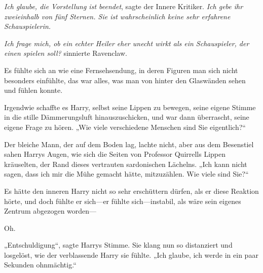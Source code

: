 \emph{Ich glaube, die Vorstellung ist beendet}, sagte der Innere Kritiker. \emph{Ich gebe ihr zweieinhalb von fünf Sternen. Sie ist wahrscheinlich keine sehr erfahrene Schauspielerin.}

\emph{Ich frage mich, ob ein echter Heiler eher unecht wirkt als ein Schauspieler, der einen spielen soll?} sinnierte Ravenclaw.

Es fühlte sich an wie eine Fernsehsendung, in deren Figuren man sich nicht besonders einfühlte, das war alles, was man von hinter den Glaswänden sehen und fühlen konnte.

Irgendwie schaffte es Harry, selbst seine Lippen zu bewegen, seine eigene Stimme in die stille Dämmerungsluft hinauszuschicken, und war dann überrascht, seine eigene Frage zu hören. „Wie viele verschiedene Menschen sind Sie eigentlich?“

Der bleiche Mann, der auf dem Boden lag, lachte nicht, aber aus dem Besenstiel sahen Harrys Augen, wie sich die Seiten von Professor Quirrells Lippen kräuselten, der Rand dieses vertrauten sardonischen Lächelns. „Ich kann nicht sagen, dass ich mir die Mühe gemacht hätte, mitzuzählen. Wie viele sind Sie?“

Es hätte den inneren Harry nicht so sehr erschüttern dürfen, als er diese Reaktion hörte, und doch fühlte er sich—er fühlte sich—instabil, als wäre sein eigenes Zentrum abgezogen worden—

Oh.

„Entschuldigung“, sagte Harrys Stimme. Sie klang nun so distanziert und losgelöst, wie der verblassende Harry sie fühlte. „Ich glaube, ich werde in ein paar Sekunden ohnmächtig.“

